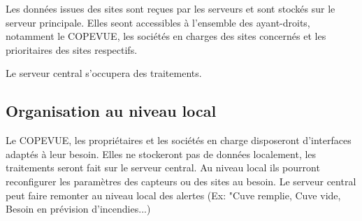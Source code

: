 Les données issues des sites sont reçues par les serveurs et sont stockés sur le serveur principale. Elles seont accessibles à l'ensemble des ayant-droits, notamment le COPEVUE, les sociétés en charges des sites concernés et les prioritaires des sites respectifs. 

Le serveur central s'occupera des traitements. 

\subsection{Organisation au niveau local}

Le COPEVUE, les propriétaires et les sociétés en charge disposeront d'interfaces adaptés à leur besoin. Elles ne stockeront pas de données localement, les traitements seront fait sur le serveur central.
Au niveau local ils pourront reconfigurer les paramètres des capteurs ou des sites au besoin.
Le serveur central peut faire remonter au niveau local des alertes (Ex: "Cuve remplie, Cuve vide, Besoin en prévision d'incendies...)






